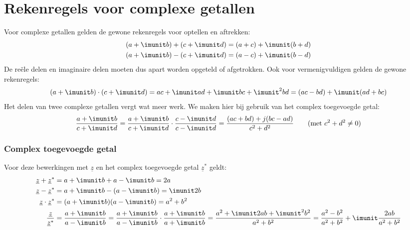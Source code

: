 \section{Rekenregels voor complexe getallen}
Voor complexe getallen gelden de gewone rekenregels voor optellen en aftrekken:
%
\begin{equation}
\begin{split}
(a + \imunit b) + (c + \imunit d) &= (a + c) + \imunit(b + d) \\
(a + \imunit b) - (c + \imunit d) &= (a - c) + \imunit(b - d) \\
\end{split}
\end{equation}
%
De reële delen en imaginaire delen moeten dus apart worden opgeteld of afgetrokken. Ook voor vermenigvuldigen gelden de gewone rekenregels:
%
\begin{equation}
(a + \imunit b) \cdot (c + \imunit d) = ac + \imunit ad + \imunit bc + \imunit^2 bd = (ac - bd) + \imunit(ad + bc)
\end{equation}
%
Het delen van twee complexe getallen vergt wat meer werk. We maken hier bij gebruik van het complex toegevoegde getal:
%
\begin{equation}
\dfrac{a+\imunit b}{c+\imunit d} = \dfrac{a+\imunit b}{c+\imunit d}\cdot\dfrac{c-\imunit d}{c-\imunit d} = \dfrac{(ac+bd)+j(bc-ad)}{c^2+d^2} \qquad(\text{met } c^2+d^2 \neq 0)
\end{equation}

\subsubsection*{Complex toegevoegde getal}
Voor deze bewerkingen met $\underline{z}$ en het complex toegevoegde getal $\underline{z}^*$ geldt:
\begin{equation}
\begin{split}
\underline{z} + \underline{z}^* &= a + \imunit b + a -\imunit b = 2a \\
\underline{z} - \underline{z}^* &= a + \imunit b - (a -\imunit b) = \imunit 2b \\
\underline{z} \cdot \underline{z}^* &= (a + \imunit b)(a - \imunit b) = a^2 + b^2 \\
\dfrac{\underline{z}}{\underline{z}^*} &= \dfrac{a + \imunit b}{a - \imunit b} = \dfrac{a + \imunit b}{a - \imunit b} \cdot \dfrac{a + \imunit b}{a + \imunit b} = \dfrac{a^2 + \imunit 2ab + \imunit^2b^2}{a^2+b^2} = \dfrac{a^2-b^2}{a^2+b^2} + \imunit\dfrac{2ab}{a^2+b^2}
\end{split}
\end{equation}


